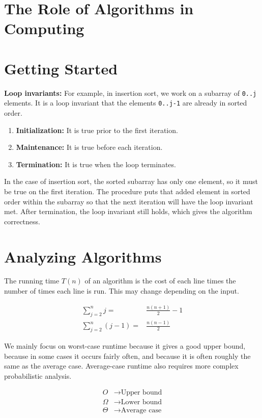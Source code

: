 \documentclass[12pt]{article}
\begin{document}
\section{The Role of Algorithms in Computing}

\section{Getting Started}
\textbf{Loop invariants:} For example, in insertion sort, we work on a subarray of \texttt{0..j} elements. It is a loop invariant that the elements \texttt{0..j-1} are already in sorted order.
\begin{enumerate}
    \item \textbf{Initialization:} It is true prior to the first iteration.
    \item \textbf{Maintenance:} It is true before each iteration.
    \item \textbf{Termination:} It is true when the loop terminates.
\end{enumerate}
In the case of insertion sort, the sorted subarray has only one element, so it must be true on the first iteration. The procedure puts that added element in sorted order within the subarray so that the next iteration will have the loop invariant met. After termination, the loop invariant still holds, which gives the algorithm correctness.

\section{Analyzing Algorithms}
The running time $T(n)$ of an algorithm is the cost of each line times the number of times each line is run. This may change depending on the input.

\begin{align*}
    \sum_{j=2}^n j =& \frac{n(n+1)}{2} - 1 \\
    \sum_{j=2}^n (j-1) =& \frac{n(n-1)}{2}
\end{align*}

We mainly focus on worst-case runtime because it gives a good upper bound, because in some cases it occurs fairly often, and because it is often roughly the same as the average case. Average-case runtime also requires more complex probabilistic analysis.

\begin{align*}
    O      &\rightarrow \text{Upper bound} \\
    \Omega &\rightarrow \text{Lower bound} \\
    \Theta &\rightarrow \text{Average case}
\end{align*}
\end{document}
